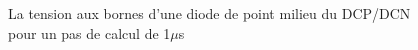 \begin{figure}[htb]

\caption{La tension aux bornes d'une diode de point milieu du DCP/DCN pour un pas de calcul de 1$\mu$s}
\label{AF_DC_HV1}
\end{figure}
\clearpage


